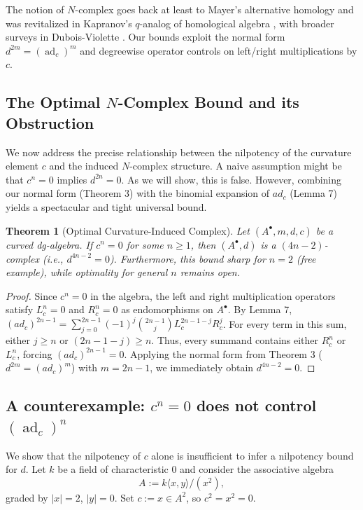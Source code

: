 \documentclass[preprint,12pt]{elsarticle}
\newcommand{\ad}{\operatorname{ad}}
\newtheorem{thm}{Theorem}
\begin{document}
\begin{rmk}
The notion of $N$-complex goes back at least to Mayer's alternative homology \cite{Mayer1942}
and was revitalized in Kapranov's $q$-analog of homological algebra \cite{Kapranov91}, with broader surveys in 
Dubois-Violette \cite{Dubois-Violette2001}. Our bounds exploit the normal form $d^{2m}=(\ad_c)^m$ and degreewise operator 
controls on left/right multiplications by $c$.
\end{rmk}

\subsection{The Optimal $N$-Complex Bound and its Obstruction}
We now address the precise relationship between the nilpotency of the curvature element $c$ and the induced $N$-complex structure. A naive assumption might be that $c^n=0$ implies $d^{2n}=0$. As we will show, this is false. However, combining our normal form (Theorem 3) with the binomial expansion of $ad_c$ (Lemma 7)  yields a spectacular and tight universal bound.

\begin{thm}[Optimal Curvature-Induced Complex]\label{thm:newX}
Let $(A^\bullet, m, d, c)$ be a curved dg-algebra. If $c^n=0$ for some $n \ge 1$, then $(A^\bullet, d)$ is a $(4n-2)$-complex (i.e., $d^{4n-2}=0$). Furthermore, this bound sharp for $n=2$ (free example), while optimality for general $n$ remains open.
\end{thm}

\begin{proof}
Since $c^n=0$ in the algebra, the left and right multiplication operators satisfy $L_c^n = 0$ and $R_c^n = 0$ as endomorphisms on $A^\bullet$. By Lemma 7, $(ad_c)^{2n-1} = \sum_{j=0}^{2n-1} (-1)^j \binom{2n-1}{j} L_c^{2n-1-j} R_c^j$. For every term in this sum, either $j \ge n$ or $(2n-1-j) \ge n$. Thus, every summand contains either $R_c^n$ or $L_c^n$, forcing $(ad_c)^{2n-1} = 0$. Applying the normal form from Theorem 3 ($d^{2m} = (ad_c)^m$)  with $m = 2n-1$, we immediately obtain $d^{4n-2} = 0$.
\end{proof}

\subsection{A counterexample: $c^n=0$ does not control $(\ad_c)^n$}\label{subsec:counterexample}

We show that the nilpotency of $c$ alone is insufficient to infer a nilpotency bound for $d$.
Let $k$ be a field of characteristic $0$ and consider the associative algebra
\[
A:=k\langle x,y\rangle/(x^2),
\]
graded by $|x|=2$, $|y|=0$. Set $c:=x \in A^2$, so $c^2=x^2=0$.
\end{document}
